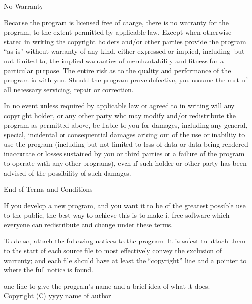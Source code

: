 \begin{lrbox}{\gpl}
\begin{minipage}{3\textwidth}
\begincentered
  {\Large\sc No Warranty}
\endcentered

\item
{\sc Because the program is licensed free of charge, there is no warranty
for the program, to the extent permitted by applicable law.  Except when
otherwise stated in writing the copyright holders and/or other parties
provide the program ``as is'' without warranty of any kind, either expressed
or implied, including, but not limited to, the implied warranties of
merchantability and fitness for a particular purpose.  The entire risk as
to the quality and performance of the program is with you.  Should the
program prove defective, you assume the cost of all necessary servicing,
repair or correction.}

\item
{\sc In no event unless required by applicable law or agreed to in writing
will any copyright holder, or any other party who may modify and/or
redistribute the program as permitted above, be liable to you for damages,
including any general, special, incidental or consequential damages arising
out of the use or inability to use the program (including but not limited
to loss of data or data being rendered inaccurate or losses sustained by
you or third parties or a failure of the program to operate with any other
programs), even if such holder or other party has been advised of the
possibility of such damages.}

\endenumeration


\begincentered
  {\Large\sc End of Terms and Conditions}
\endcentered


\pagebreak[2]


If you develop a new program, and you want it to be of the greatest
possible use to the public, the best way to achieve this is to make it
free software which everyone can redistribute and change under these
terms.

  To do so, attach the following notices to the program.  It is safest to
  attach them to the start of each source file to most effectively convey
  the exclusion of warranty; and each file should have at least the
  ``copyright'' line and a pointer to where the full notice is found.

\beginnarrower
  one line to give the program's name and a brief idea of what it does. \\
  Copyright (C) yyyy  name of author \\


\end{minipage}
\end{lrbox}
